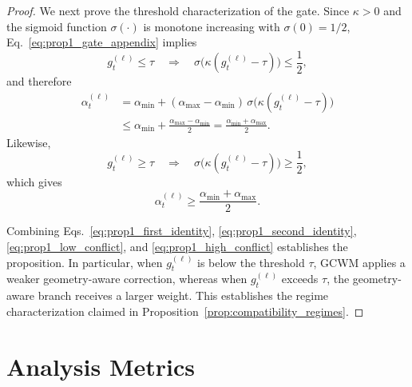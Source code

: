 \documentclass{article}
\begin{document}
\begin{proof}
We next prove the threshold characterization of the gate. Since \(\kappa>0\) and the sigmoid function \(\sigma(\cdot)\) is monotone increasing with \(\sigma(0)=1/2\), Eq.~\eqref{eq:prop1_gate_appendix} implies
\[
g_t^{(\ell)} \le \tau
\quad\Longrightarrow\quad
\sigma\!\bigl(\kappa(g_t^{(\ell)}-\tau)\bigr)\le \frac12,
\]
and therefore
\begin{align}
\alpha_t^{(\ell)}
&=
\alpha_{\min}
+
(\alpha_{\max}-\alpha_{\min})
\,\sigma\!\bigl(\kappa(g_t^{(\ell)}-\tau)\bigr)
\nonumber\\
&\le
\alpha_{\min}
+
\frac{\alpha_{\max}-\alpha_{\min}}{2}
=
\frac{\alpha_{\min}+\alpha_{\max}}{2}.
\label{eq:prop1_low_conflict}
\end{align}
Likewise,
\[
g_t^{(\ell)} \ge \tau
\quad\Longrightarrow\quad
\sigma\!\bigl(\kappa(g_t^{(\ell)}-\tau)\bigr)\ge \frac12,
\]
which gives
\begin{equation}
\alpha_t^{(\ell)}
\ge
\frac{\alpha_{\min}+\alpha_{\max}}{2}.
\label{eq:prop1_high_conflict}
\end{equation}

Combining Eqs.~\eqref{eq:prop1_first_identity}, \eqref{eq:prop1_second_identity}, \eqref{eq:prop1_low_conflict}, and \eqref{eq:prop1_high_conflict} establishes the proposition. In particular, when \(g_t^{(\ell)}\) is below the threshold \(\tau\), GCWM applies a weaker geometry-aware correction, whereas when \(g_t^{(\ell)}\) exceeds \(\tau\), the geometry-aware branch receives a larger weight. This establishes the regime characterization claimed in Proposition~\ref{prop:compatibility_regimes}.
\end{proof}




\section{Analysis Metrics}
\label{app:analysis_metrics}
\end{document}
